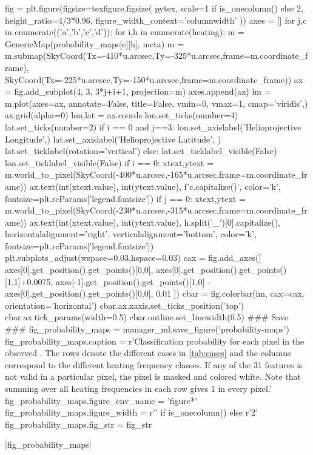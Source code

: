 \begin{pycode}[manager_ml]
fig = plt.figure(figsize=texfigure.figsize(
    pytex,
    scale=1 if is_onecolumn() else 2,
    height_ratio=4/3*0.96,
    figure_width_context='columnwidth'
))
axes = []
for j,c in enumerate(('a','b','c','d')):
    for i,h in enumerate(heating):
        m = GenericMap(probability_maps[c][h], meta)
        m = m.submap(SkyCoord(Tx=-410*u.arcsec,Ty=-325*u.arcsec,frame=m.coordinate_frame),
                     SkyCoord(Tx=-225*u.arcsec,Ty=-150*u.arcsec,frame=m.coordinate_frame))
        ax = fig.add_subplot(4, 3, 3*j+i+1, projection=m)
        axes.append(ax)
        im = m.plot(axes=ax, annotate=False, title=False, vmin=0, vmax=1, cmap='viridis',)
        ax.grid(alpha=0)
        lon,lat = ax.coords
        lon.set_ticks(number=4)
        lat.set_ticks(number=2)
        if i == 0 and j==3:
            lon.set_axislabel('Helioprojective Longitude',)
            lat.set_axislabel('Helioprojective Latitude', )
            lat.set_ticklabel(rotation='vertical')
        else:
            lat.set_ticklabel_visible(False)
            lon.set_ticklabel_visible(False)
        if i == 0:
            xtext,ytext = m.world_to_pixel(SkyCoord(-400*u.arcsec,-165*u.arcsec,frame=m.coordinate_frame))
            ax.text(int(xtext.value), int(ytext.value), f'{c.capitalize()}', color='k', fontsize=plt.rcParams['legend.fontsize'])
        if j == 0:
            xtext,ytext = m.world_to_pixel(SkyCoord(-230*u.arcsec,-315*u.arcsec,frame=m.coordinate_frame))
            ax.text(int(xtext.value), int(ytext.value),
                    h.split('_')[0].capitalize(),
                    horizontalalignment='right',
                    verticalalignment='bottom',
                    color='k', fontsize=plt.rcParams['legend.fontsize'])
plt.subplots_adjust(wspace=0.03,hspace=0.03)
cax = fig.add_axes([
    axes[0].get_position().get_points()[0,0],
    axes[0].get_position().get_points()[1,1]+0.0075,
    axes[-1].get_position().get_points()[1,0] - axes[0].get_position().get_points()[0,0],
    0.01
])
cbar = fig.colorbar(im, cax=cax, orientation='horizontal')
cbar.ax.xaxis.set_ticks_position('top')
cbar.ax.tick_params(width=0.5)
cbar.outline.set_linewidth(0.5)
### Save ###
fig_probability_maps = manager_ml.save_figure('probability-maps')
fig_probability_maps.caption = r'Classification probability for each pixel in the observed \AR{}. The rows denote the different cases in \autoref{tab:cases} and the columns correspond to the different heating frequency classes. If any of the 31 features is not valid in a particular pixel, the pixel is masked and colored white. Note that summing over all heating frequencies in each row gives 1 in every pixel.'
fig_probability_maps.figure_env_name = 'figure*'
fig_probability_maps.figure_width = r'\columnwidth' if is_onecolumn() else r'2\columnwidth'
fig_probability_maps.fig_str = fig_str
\end{pycode}
\py[manager_ml]|fig_probability_maps|

